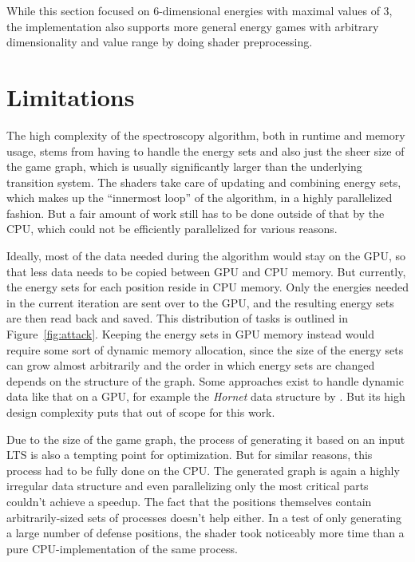 While this section focused on 6-dimensional energies with maximal values of 3,
the implementation also supports more general energy games with arbitrary
dimensionality and value range by doing shader preprocessing.


\section{Limitations}

The high complexity of the spectroscopy algorithm,
both in runtime and memory usage,
stems from having to handle the energy sets
and also just the sheer size of the game graph,
which is usually significantly larger than the underlying transition system.
The shaders take care of updating and combining energy sets,
which makes up the \enquote{innermost loop} of the algorithm,
in a highly parallelized fashion. 
But a fair amount of work still has to be done
outside of that by the CPU,
which could not be efficiently parallelized for various reasons.

Ideally, most of the data needed during the algorithm would stay on the GPU,
so that less data needs to be copied between GPU and CPU memory.
But currently, the energy sets for each position reside in CPU memory.
Only the energies needed in the current iteration are sent over to the GPU,
and the resulting energy sets are then read back and saved.
This distribution of tasks is outlined in Figure~\ref{fig:attack}.
Keeping the energy sets in GPU memory instead would require some sort of
dynamic memory allocation,
since the size of the energy sets can grow almost arbitrarily
and the order in which energy sets are changed depends on the structure of the
graph.
Some approaches exist to handle dynamic data like that on a GPU,
for example the \emph{Hornet} data structure by \textcite{Busato2018}.
But its high design complexity puts that out of scope for this work.

Due to the size of the game graph, the process of generating it based on an
input LTS is also a tempting point for optimization.
But for similar reasons, this process had to be fully done on the CPU\@.
The generated graph is again a highly irregular data structure and
even parallelizing only the most critical parts couldn't achieve a speedup.
The fact that the positions themselves contain arbitrarily-sized sets of
processes doesn't help either.
In a test of only generating a large number of defense positions,
the shader took noticeably more time than a pure CPU-implementation of the same
process.

